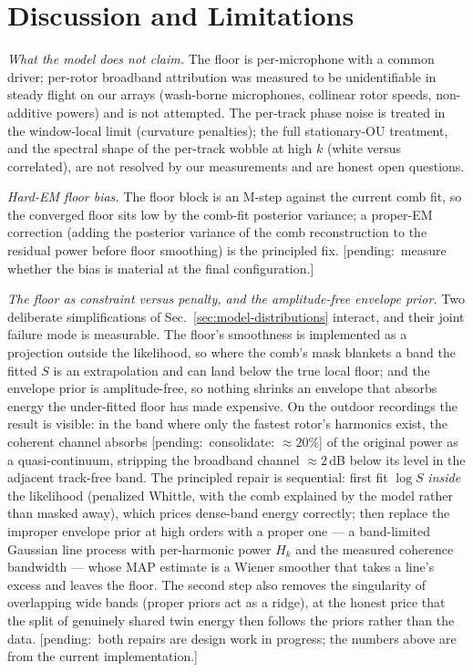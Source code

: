 \documentclass[journal]{IEEEtran}
\newcommand{\pending}[1]{{\color{gray}\textsf{[pending:~#1]}}}
\begin{document}
\section{Discussion and Limitations}
\label{sec:discussion}

\emph{What the model does not claim.} The floor is per-microphone with a
common driver; per-rotor broadband attribution was measured to be
unidentifiable in steady flight on our arrays (wash-borne microphones,
collinear rotor speeds, non-additive powers) and is not attempted. The
per-track phase noise is treated in the window-local limit (curvature
penalties); the full stationary-OU treatment, and the spectral shape of
the per-track wobble at high $k$ (white versus correlated), are not
resolved by our measurements and are honest open questions.

\emph{Hard-EM floor bias.} The floor block is an M-step against the
current comb fit, so the converged floor sits low by the comb-fit
posterior variance; a proper-EM correction (adding the posterior
variance of the comb reconstruction to the residual power before floor
smoothing) is the principled fix. \pending{measure whether the bias is
material at the final configuration.}

\emph{The floor as constraint versus penalty, and the amplitude-free
envelope prior.} Two deliberate simplifications of
Sec.~\ref{sec:model-distributions} interact, and their joint failure
mode is measurable. The floor's smoothness is implemented as a
projection outside the likelihood, so where the comb's mask blankets a
band the fitted $S$ is an extrapolation and can land below the true
local floor; and the envelope prior is amplitude-free, so nothing
shrinks an envelope that absorbs energy the under-fitted floor has
made expensive. On the outdoor recordings the result is visible: in
the band where only the fastest rotor's harmonics exist, the coherent
channel absorbs \pending{consolidate: $\approx 20\%$} of the original
power as a quasi-continuum, stripping the broadband channel
$\approx 2$\,dB below its level in the adjacent track-free band. The
principled repair is sequential: first fit $\log S$ \emph{inside} the
likelihood (penalized Whittle, with the comb explained by the model
rather than masked away), which prices dense-band energy correctly;
then replace the improper envelope prior at high orders with a proper
one --- a band-limited Gaussian line process with per-harmonic power
$H_k$ and the measured coherence bandwidth --- whose MAP estimate is a
Wiener smoother that takes a line's excess and leaves the floor. The
second step also removes the singularity of overlapping wide bands
(proper priors act as a ridge), at the honest price that the split of
genuinely shared twin energy then follows the priors rather than the
data. \pending{both repairs are design work in progress; the numbers
above are from the current implementation.}
\end{document}
